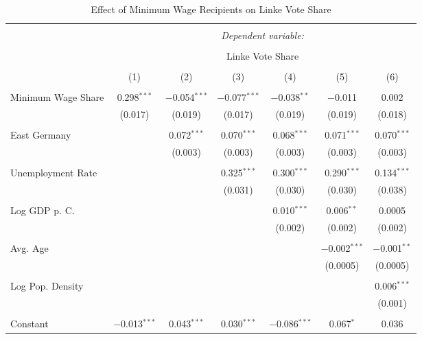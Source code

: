 
\begin{table}[!htbp] \centering 
  \caption{Effect of Minimum Wage Recipients on Linke Vote Share} 
  \label{} 
\begin{tabular}{@{\extracolsep{5pt}}lcccccc} 
\\[-1.8ex]\hline 
\hline \\[-1.8ex] 
 & \multicolumn{6}{c}{\textit{Dependent variable:}} \\ 
\cline{2-7} 
\\[-1.8ex] & \multicolumn{6}{c}{Linke Vote Share} \\ 
\\[-1.8ex] & (1) & (2) & (3) & (4) & (5) & (6)\\ 
\hline \\[-1.8ex] 
 Minimum Wage Share & 0.298$^{***}$ & $-$0.054$^{***}$ & $-$0.077$^{***}$ & $-$0.038$^{**}$ & $-$0.011 & 0.002 \\ 
  & (0.017) & (0.019) & (0.017) & (0.019) & (0.019) & (0.018) \\ 
  & & & & & & \\ 
 East Germany &  & 0.072$^{***}$ & 0.070$^{***}$ & 0.068$^{***}$ & 0.071$^{***}$ & 0.070$^{***}$ \\ 
  &  & (0.003) & (0.003) & (0.003) & (0.003) & (0.003) \\ 
  & & & & & & \\ 
 Unemployment Rate &  &  & 0.325$^{***}$ & 0.300$^{***}$ & 0.290$^{***}$ & 0.134$^{***}$ \\ 
  &  &  & (0.031) & (0.030) & (0.030) & (0.038) \\ 
  & & & & & & \\ 
 Log GDP p. C. &  &  &  & 0.010$^{***}$ & 0.006$^{**}$ & 0.0005 \\ 
  &  &  &  & (0.002) & (0.002) & (0.002) \\ 
  & & & & & & \\ 
 Avg. Age &  &  &  &  & $-$0.002$^{***}$ & $-$0.001$^{**}$ \\ 
  &  &  &  &  & (0.0005) & (0.0005) \\ 
  & & & & & & \\ 
 Log Pop. Density &  &  &  &  &  & 0.006$^{***}$ \\ 
  &  &  &  &  &  & (0.001) \\ 
  & & & & & & \\ 
 Constant & $-$0.013$^{***}$ & 0.043$^{***}$ & 0.030$^{***}$ & $-$0.086$^{***}$ & 0.067$^{*}$ & 0.036 \\ 

\end{tabular}
\end{table}
